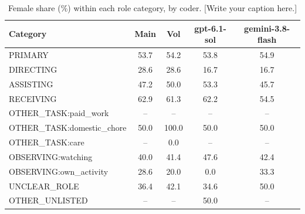 \begin{table}[t]
\centering
\scriptsize
\begin{tabular}{@{}lcccc@{}}
\toprule
Category & \textbf{Main} & \textbf{Vol} & \textbf{gpt-6.1-sol} & \textbf{gemini-3.8-flash} \\
\midrule
PRIMARY & 53.7 & 54.2 & 53.8 & 54.9 \\
DIRECTING & 28.6 & 28.6 & 16.7 & 16.7 \\
ASSISTING & 47.2 & 50.0 & 53.3 & 45.7 \\
RECEIVING & 62.9 & 61.3 & 62.2 & 54.5 \\
OTHER\_TASK:paid\_work & -- & -- & -- & -- \\
OTHER\_TASK:domestic\_chore & 50.0 & 100.0 & 50.0 & 50.0 \\
OTHER\_TASK:care & -- & 0.0 & -- & -- \\
OBSERVING:watching & 40.0 & 41.4 & 47.6 & 42.4 \\
OBSERVING:own\_activity & 28.6 & 20.0 & 0.0 & 33.3 \\
UNCLEAR\_ROLE & 36.4 & 42.1 & 34.6 & 50.0 \\
OTHER\_UNLISTED & -- & -- & 50.0 & -- \\
\bottomrule
\end{tabular}
\caption{Female share (\%) within each role category, by coder. [Write your caption here.]}
\label{tab:category-shares}
\end{table}
